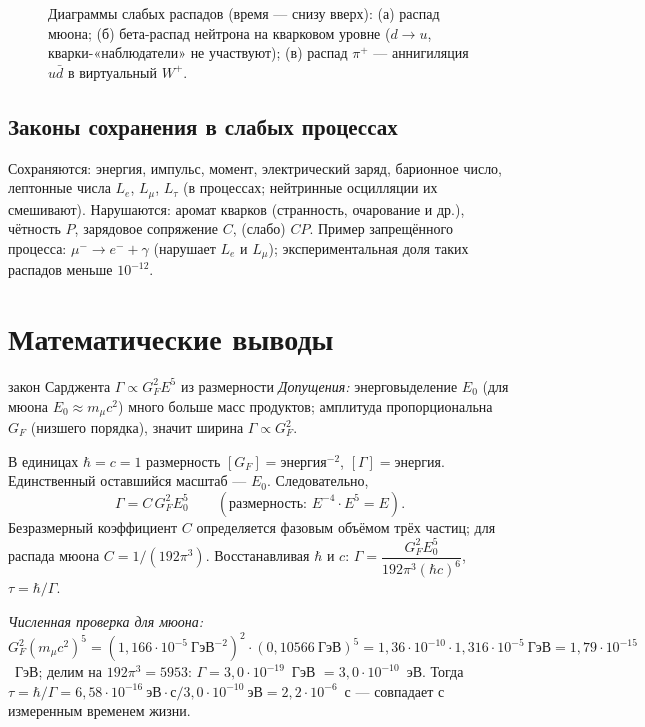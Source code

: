 \begin{figure}[htbp]
\caption{Диаграммы слабых распадов (время — снизу вверх): (а) распад мюона; (б) бета-распад нейтрона на кварковом уровне
($d\to u$, кварки-«наблюдатели» не участвуют); (в) распад $\pi^+$ — аннигиляция $u\bar d$ в виртуальный $W^+$.}
\label{fig:16:decays}
\end{figure}

\subsection{Законы сохранения в слабых процессах}

Сохраняются: энергия, импульс, момент, электрический заряд, барионное число, лептонные числа $L_e$, $L_\mu$, $L_\tau$
(в процессах; нейтринные осцилляции их смешивают). Нарушаются: аромат кварков (странность, очарование и др.),
чётность $P$, зарядовое сопряжение $C$, (слабо) $CP$. Пример запрещённого процесса: $\mu^-\to e^-+\gamma$ (нарушает
$L_e$ и $L_\mu$); экспериментальная доля таких распадов меньше $10^{-12}$.

\section{Математические выводы}

\begin{derivation}[label=der:16:sargent]{закон Сарджента $\Gamma\propto G_F^2E^5$ из размерности}
\emph{Допущения:} энерговыделение $E_0$ (для мюона $E_0\approx m_\mu c^2$) много больше масс продуктов; амплитуда
пропорциональна $G_F$ (низшего порядка), значит ширина $\Gamma\propto G_F^2$.

В единицах $\hbar=c=1$ размерность $[G_F]=\text{энергия}^{-2}$, $[\Gamma]=\text{энергия}$. Единственный оставшийся масштаб — $E_0$.
Следовательно,
\[
  \Gamma=C\,G_F^2E_0^5\qquad(\text{размерность: }E^{-4}\cdot E^5=E).
\]
Безразмерный коэффициент $C$ определяется фазовым объёмом трёх частиц; для распада мюона $C=1/(192\pi^3)$.
Восстанавливая $\hbar$ и $c$: $\Gamma=\dfrac{G_F^2E_0^5}{192\pi^3(\hbar c)^6}$, $\tau=\hbar/\Gamma$.

\emph{Численная проверка для мюона:}
$G_F^2(m_\mu c^2)^5=(1{,}166\cdot10^{-5}\ \text{ГэВ}^{-2})^2\cdot(0{,}10566\ \text{ГэВ})^5=1{,}36\cdot10^{-10}\cdot1{,}316\cdot10^{-5}\ \text{ГэВ}=1{,}79\cdot10^{-15}$~ГэВ;
делим на $192\pi^3=5953$: $\Gamma=3{,}0\cdot10^{-19}$~ГэВ $=3{,}0\cdot10^{-10}$~эВ. Тогда
$\tau=\hbar/\Gamma=6{,}58\cdot10^{-16}\ \text{эВ}\cdot\text{с}/3{,}0\cdot10^{-10}\ \text{эВ}=2{,}2\cdot10^{-6}$~с — совпадает с измеренным временем жизни.
\end{derivation}

